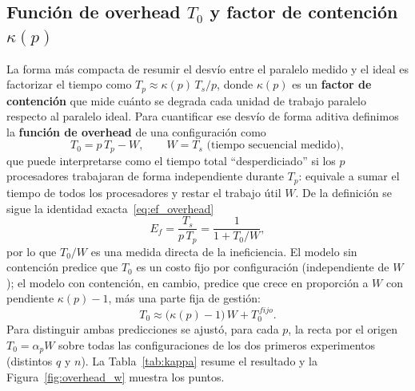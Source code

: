 \documentclass[11pt, a4paper]{article}
\begin{document}
\subsection{Función de overhead $T_0$ y factor de contención $\kappa(p)$}
\label{subsec:kappa}

La forma más compacta de resumir el desvío entre el paralelo medido y el ideal es factorizar el tiempo como $T_p \approx \kappa(p)\,T_s/p$, donde $\kappa(p)$ es un \textbf{factor de contención} que mide cuánto se degrada cada unidad de trabajo paralelo respecto al paralelo ideal. Para cuantificar ese desvío de forma aditiva definimos la \textbf{función de overhead} de una configuración como
\begin{equation}
T_0 = p\,T_p - W, \qquad W = T_s \text{ (tiempo secuencial medido)},
\label{eq:overhead}
\end{equation}
que puede interpretarse como el tiempo total ``desperdiciado'' si los $p$ procesadores trabajaran de forma independiente durante $T_p$: equivale a sumar el tiempo de todos los procesadores y restar el trabajo útil $W$. De la definición se sigue la identidad exacta~\eqref{eq:ef_overhead}
\begin{equation}
E_f = \frac{T_s}{p\,T_p} = \frac{1}{1 + T_0/W},
\label{eq:ef_overhead}
\end{equation}
por lo que $T_0/W$ es una medida directa de la ineficiencia. El modelo sin contención predice que $T_0$ es un costo fijo por configuración (independiente de $W$); el modelo con contención, en cambio, predice que crece en proporción a $W$ con pendiente $\kappa(p)-1$, más una parte fija de gestión:
\begin{equation}
T_0 \approx \bigl(\kappa(p)-1\bigr)\,W + T_0^{\,fijo}.
\label{eq:overhead_kappa}
\end{equation}
Para distinguir ambas predicciones se ajustó, para cada $p$, la recta por el origen $T_0 = \alpha_p W$ sobre todas las configuraciones de los dos primeros experimentos (distintos $q$ y $n$). La Tabla~\ref{tab:kappa} resume el resultado y la Figura~\ref{fig:overhead_w} muestra los puntos.
\end{document}
